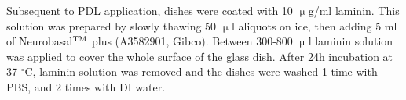 
Subsequent to PDL application, dishes were coated with 10 $\upmu$g/ml laminin.
This solution was prepared by slowly thawing 50 $\upmu$l aliquots on ice, then
adding 5 ml of Neurobasal$\rm^{TM}$ plus (A3582901, Gibco). Between 300-800
$\upmu$l laminin solution was applied to cover the whole surface of the glass
dish. After 24h incubation at 37 $^{\circ}$C, laminin solution was removed and
the dishes were washed 1 time with PBS, and 2 times with DI water.




